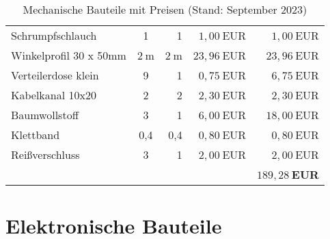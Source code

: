 \documentclass[./00PhotoBox.tex]{subfiles}
\begin{document}
\begin{table}[ht]
\begin{tabular}{l|c|r|r|r}
        Schrumpfschlauch              & 1       & 1       & $1,00~$EUR  & $1,00~$EUR            \\
        Winkelprofil 30 x 50mm        & $2~$m   & $2~$m   & $23,96~$EUR & $23,96~$EUR           \\
        Verteilerdose klein           & 9       & 1       & $0,75~$EUR  & $6,75~$EUR            \\
        Kabelkanal 10x20              & 2       & 2       & $2,30~$EUR  & $2,30~$EUR            \\
        Baumwollstoff                 & 3       & 1       & $6,00~$EUR  & $18,00~$EUR           \\
        Klettband                     & 0,4     & 0,4     & $0,80~$EUR  & $0,80~$EUR            \\
        Reißverschluss                & 3       & 1       & $2,00~$EUR  & $2,00~$EUR            \\
                                      &         &         &             & \textbf{$189,28~$EUR} \\
    \end{tabular}
    \caption{Mechanische Bauteile mit Preisen (Stand: September 2023)}
    \label{tab:bauteile_mechanisch}
\end{table}

\clearpage

\section{Elektronische Bauteile}
\end{document}
